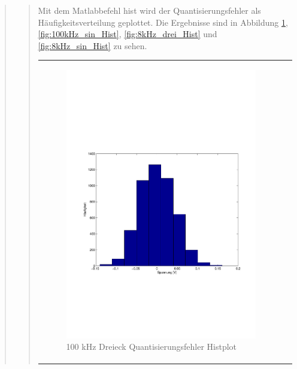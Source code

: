 \begin{quote}
\begin{quote}
        
        \vspace{2em} 
         
        Mit dem Matlabbefehl hist wird der Quantisierungsfehler als Häufigkeitsverteilung geplottet. Die Ergebnisse sind in
        Abbildung \ref{fig:100kHz_drei_Hist}, \ref{fig:100kHz_sin_Hist}, \ref{fig:8kHz_drei_Hist} und
        \ref{fig:8kHz_sin_Hist} zu sehen.
        
        \begin{center}
            \begin{tabular}{ll}
            
            \hspace{-4cm}
                \begin{minipage}{0.6\textwidth}
                    \begin{figure}[H]
                        \includegraphics[scale=0.5, trim = 16mm 70mm 16mm 85mm, clip]
                                        {Bilder/100kHz_dreieck_Quant_Hist}
                        \caption{100 kHz Dreieck Quantisierungsfehler Histplot}
                        \label{fig:100kHz_drei_Hist}
                    \end{figure}
                \end{minipage}
                

\end{tabular}
\end{center}
\end{quote}
\end{quote}
